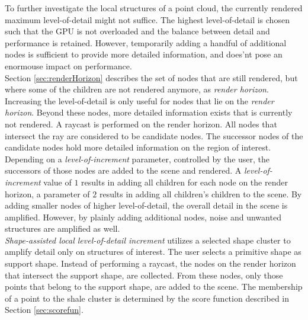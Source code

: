 To further investigate the local structures of a point cloud, the currently rendered maximum level-of-detail might not suffice. The highest level-of-detail is chosen such that the GPU is not overloaded and the balance between detail and performance is retained. However, temporarily adding a handful of additional nodes is sufficient to provide more detailed information, and does'nt pose an enormouse impact on performance. 
\\

Section \ref{sec:renderHorizon} describes the set of nodes that are still rendered, but where some of the children are not rendered anymore, as \textit{render horizon}. 
Increasing the level-of-detail is only useful for nodes that lie on the \textit{render horizon}. Beyond these nodes, more detailed information exists that is currently not rendered. A raycast is performed on the render horizon. All nodes that intersect the ray are considered to be candidate nodes. The successor nodes of the candidate nodes hold more detailed information on the region of interest. Depending on a \textit{level-of-increment} parameter, controlled by the user, the successors of those nodes are added to the scene and rendered. A \textit{level-of-increment} value of $1$ results in adding all children for each node on the render horizon, a parameter of $2$ results in adding all children's children to the scene. 
By adding smaller nodes of higher level-of-detail, the overall detail in the scene is amplified. However, by plainly adding additional nodes, noise and unwanted structures are amplified as well. 
\\

\textit{Shape-assisted local level-of-detail increment} utilizes a selected shape cluster to amplify detail only on structures of interest. The user selects a primitive shape as support shape. Instead of performing a raycast, the nodes on the render horizon that intersect the support shape, are collected. From these nodes, only those points that belong to the support shape, are added to the scene. The membership of a point to the shale cluster is determined by the score function described in Section \ref{sec:scorefun}. 

